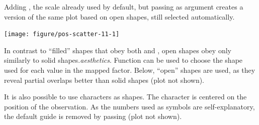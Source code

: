 \documentclass[krantz2]{krantz}\usepackage{knitr}
\begin{document}
Adding , the scale already used by default, but passing  as argument creates a version of the same plot based on open shapes, still selected automatically.

\begin{knitrout}\footnotesize
{}\color{fgcolor}\begin{kframe}
\begin{alltt}
 \hlopt{+}
  \hlstd{(} \hlstd{=} \hlstd{)}
\end{alltt}
\end{kframe}

{\centering \texttt{[image: figure/pos-scatter-11-1]} 

}


\end{knitrout}

In contrast to ``filled'' shapes that obey both  and , open shapes obey only  similarly to solid shapes.\emph{aesthetics}. Function  can be used to choose the shape used for each value in the mapped factor. Below, ``open'' shapes are used, as they reveal partial overlaps better than solid shapes (plot not shown).\label{chunk:filled:symbols}

\begin{knitrout}\footnotesize
{}\color{fgcolor}\begin{kframe}
\begin{alltt}
 \hlopt{+}
  \hlstd{(} \hlstd{=} \hlstd{(}\hlstd{,}
                                \hlstd{,}
                                \hlstd{))}
\end{alltt}
\end{kframe}
\end{knitrout}

It is also possible to use characters as shapes. The character is centered on the position of the observation. As the numbers used as symbols are self-explanatory, the default guide is removed by passing  (plot not shown).\label{chunk:plot:point:char}

\begin{knitrout}\footnotesize
{}\color{fgcolor}\begin{kframe}
\begin{alltt}
 \hlopt{+}
 \hlstd{(} \hlstd{=} \hlstd{(}\hlstd{,} \hlstd{,} \hlstd{),}  \hlstd{=} \hlstd{)}
\end{alltt}
\end{kframe}
\end{knitrout}
\end{document}
